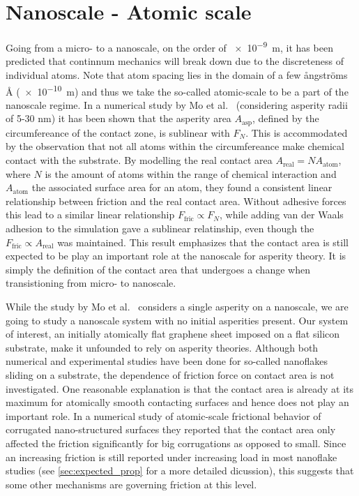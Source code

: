 \section{Nanoscale - Atomic scale}
Going from a micro- to a nanoscale, on the order of \SI{e-9}{m}, it has been
predicted that continnum mechanics will break down \cite{luan_breakdown_2005}
due to the discreteness of individual atoms. Note that atom spacing lies in the
domain of a few ångströms Å (\SI{e-10}{m}) and thus we take the so-called atomic-scale to be a part of the nanoscale regime. In a numerical
study by Mo et al.\ \cite{mo_friction_2009} (considering asperity radii of 5-30
nm) it has been shown that the asperity area $A_{\text{asp}}$, defined by the
circumfereance of the contact zone, is sublinear with
$F_N$. This is accommodated by the observation that not all atoms within the
circumfereance make chemical contact with the substrate. By
modelling the real contact area $A_{\text{real}} = NA_{\text{atom}}$, where $N$ is the amount of atoms within the range of chemical interaction and
$A_{\text{atom}}$ the associated surface area for an atom, they found a consistent
linear relationship between friction and the real contact area. Without adhesive
forces this lead to a similar linear relationship $F_{\text{fric}} \propto F_N$,
while adding van der Waals adhesion to the simulation gave a sublinear
relatinship, even though the $F_{\text{fric}} \propto A_{\text{real}}$ was
maintained. This result emphasizes that the contact area is still expected to be play an important role at the nanoscale for asperity theory. It is simply the definition of the contact area that undergoes a change when transistioning from micro- to nanoscale. 



While the study by Mo et al.\ \cite{mo_friction_2009} considers a single
asperity on a nanoscale, we are going to study a nanoscale system with no
initial asperities present. Our system of interest, an initially atomically flat graphene sheet imposed on a flat silicon substrate, make it unfounded to rely on asperity theories. Although both numerical \cite{zhu_study_2018}\cite{ma12091425}\cite{bonelli_atomistic_2009} and experimental \cite[2005]{DIENWIEBEL2005197}\cite{feng_superlubric_2013} studies have been done for so-called nanoflakes
sliding on a substrate, the dependence of friction force on contact area is not investigated.  One reasonable explanation is that the contact area is already at its maximum for atomically smooth contacting surfaces and hence does not play an important role. In a numerical study of atomic-scale frictional behavior of corrugated nano-structured surfaces \cite{C2NR30691C} they reported that the contact area only affected the friction significantly for big corrugations as opposed to small. Since an increasing friction is still reported under increasing load in most nanoflake studies (see
\cref{sec:expected_prop} for a more detailed dicussion), this suggests
that some other mechanisms are governing friction at this level. 

